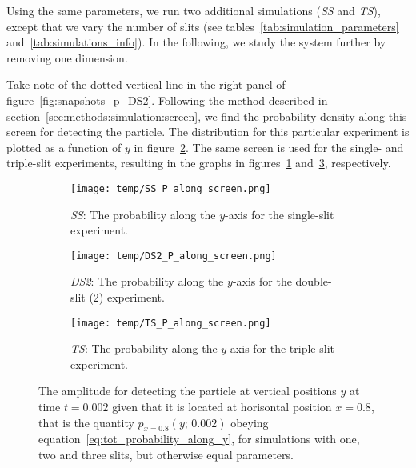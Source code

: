     Using the same parameters, we run two additional simulations (\textit{SS} and \textit{TS}), except that we vary the number of slits (see tables~\ref{tab:simulation_parameters} and~\ref{tab:simulations_info}). In the following, we study the system further by removing one dimension.

    Take note of the dotted vertical line in the right panel of figure~\ref{fig:snapshots_p_DS2}. Following the method described in section~\ref{sec:methods:simulation:screen}, we find the probability density along this screen for detecting the particle.  The distribution for this particular experiment is plotted as a function of $y$ in figure~\ref{fig:p_along_y_DS2}. The same screen is used for the single- and triple-slit experiments, resulting in the graphs in figures~\ref{fig:p_along_y_SS} and~\ref{fig:p_along_y_TS}, respectively. %

    \begin{figure}
        \centering
        \begin{subfigure}{0.46\textwidth}
            \texttt{[image: temp/SS\_P\_along\_screen.png]}
            \caption{\textit{SS}: The probability along the $y$-axis for the single-slit experiment.}
            \label{fig:p_along_y_SS}
        \end{subfigure}
        \hfill
        \begin{subfigure}{0.46\textwidth}
            \texttt{[image: temp/DS2\_P\_along\_screen.png]}
            \caption{\textit{DS2}: The probability along the $y$-axis for the double-slit (2) experiment.}
            \label{fig:p_along_y_DS2}
        \end{subfigure}
        \hfill
        \begin{subfigure}{0.46\textwidth}
            \texttt{[image: temp/TS\_P\_along\_screen.png]}
            \caption{\textit{TS}: The probability along the $y$-axis for the triple-slit experiment.}
            \label{fig:p_along_y_TS}
        \end{subfigure}
        \caption{The amplitude for detecting the particle at vertical positions $y$ at time $t=0.002$ given that it is located at horisontal position $x=0.8$, that is the quantity $p_{x=0.8}(y;\, 0.002)$ obeying equation~\eqref{eq:tot_probability_along_y}, for simulations with one, two and three slits, but otherwise equal parameters.}
        \label{fig:p_along_y}
    \end{figure}






